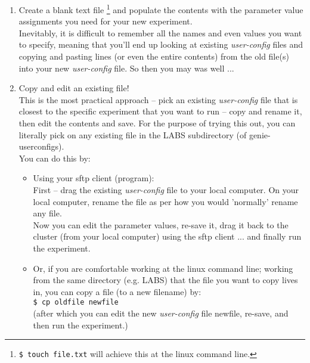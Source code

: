 \documentclass[11pt,fleqn]{book} %
\begin{document}
\begin{enumerate}[noitemsep]

\vspace{1mm}
\item Create a blank text file \footnote{\texttt{\$ touch file.txt} will achieve this at the linux command line.} and populate the contents with the parameter value assignments you need for your new experiment.
\\Inevitably, it is difficult to remember all the names and even values you want to specify, meaning that you'll end up looking at existing \textit{user-config} files and copying and pasting lines (or even the entire contents) from the old file(s) into your new \textit{user-config} file. So then you may was well ...

\vspace{1mm}
\item Copy and edit an existing file!
\\This is the most practical approach -- pick an existing \textit{user-config} file that is closest to the specific experiment that you want to run -- copy and rename it, then edit the contents and save. For the purpose of trying this out, you can literally pick on any existing file in the \textsf{\footnotesize LABS } subdirectory (of \textsf{\footnotesize genie-userconfigs}).
\\ You can do this by:
\begin{itemize}[noitemsep]
\item Using your sftp client (program):
\\First -- drag the existing \textit{user-config} file to your local computer. On your local computer, rename the file as per how you would 'normally' rename any file. 
\\Now you can edit the parameter values, re-save it, drag it back to the cluster (from your local computer) using the sftp client ... and finally run the experiment.
\item Or, if you are comfortable working at the linux command line; working from the same directory (e.g. \textsf{\footnotesize LABS}) that the file you want to copy lives in, you can copy a file (to a new filename) by:
\\\texttt{\$ cp oldfile newfile }
\\(after which you can edit the new \textit{user-config} file \textsf{\footnotesize newfile}, re-save, and then run the experiment.)
\end{itemize}
\vspace{1mm}

\end{enumerate}
\end{document}
